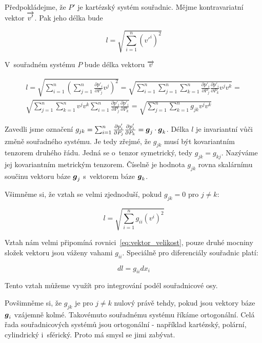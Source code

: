Předpokládejme, že \(P'\) je kartézský systém souřadnic. Mějme kontravariatní vektor \(\overrightarrow{v'}\). Pak jeho délka bude

\begin{equation}
l = \sqrt{\sum_{i=1}^n (v'^i)^2}
\end{equation}

V~souřadném systému \(P\) bude délka vektoru \(\overrightarrow{v}\)

\begin{equation}
\begin{split}
l = \sqrt{\sum_{i=1}^n \left(\sum_{j=1}^n \frac{\partial p'_i}{\partial P_j} v^j \right)^2} = \sqrt{\sum_{i=1}^n \sum_{j=1}^n \sum_{k=1}^n \frac{\partial p'_i}{\partial P_j} \frac{\partial p'_i}{\partial P_k} v^j v^k} = \\
\sqrt{\sum_{j=1}^n \sum_{k=1}^n v^j v^k \sum_{i=1}^n \frac{\partial p'_i}{\partial P_j} \frac{\partial p'_i}{\partial P_k}} = \sqrt{\sum_{j=1}^n \sum_{k=1}^n g_{jk} v^j v^k}
\end{split}
\end{equation}

Zavedli jsme označení \(g_{jk} = \sum_{i=1}^n \frac{\partial p'_i}{\partial P_j} \frac{\partial p'_i}{\partial P_k} = \boldsymbol{g}_j \cdot \boldsymbol{g}_k\). Délka \(l\) je invariantní vůči změně souřadného systému. Je tedy zřejmé, že \(g_{jk}\) musí být kovariantním tenzorem druhého řádu. Jedná se o~tenzor symetrický, tedy \(g_{jk} = g_{kj}\). Nazýváme jej kovariantním metrickým tenzorem. Číselně je hodnota \(g_{jk}\) rovna skalárnímu součinu vektoru báze \(\boldsymbol{g}_j\) s~vektorem báze \(\boldsymbol{g}_k\).

Všimněme si, že vztah se velmi zjednoduší, pokud \(g_{jk} = 0\) pro \(j \neq k\):

\begin{equation}
l = \sqrt{\sum_{i=1}^n g_{ii} (v^i)^2}
\end{equation}

Vztah nám velmi připomíná rovnici~\eqref{eq:vektor_velikost}, pouze druhé mocniny složek vektoru jsou váženy vahami \(g_{ii}\). Speciálně pro diferenciály souřadnic platí:

\begin{equation}
\label{eq:delka_diferencial_souradnic}
dl = g_{ii} dx_i
\end{equation}

Tento vztah můžeme využít pro integrování podél souřadnicové osy.

Povšimněme si, že \(g_{jk}\) je pro \(j \neq k\) nulový právě tehdy, pokud jsou vektory báze \(\boldsymbol{g}_i\) vzájemně kolmé. Takovémuto souřadnému systému říkáme ortogonální. Celá řada souřadnicových systémů jsou ortogonální - například kartézský, polární, cylindrický i~sférický. Proto má smysl se jimi zabývat.

